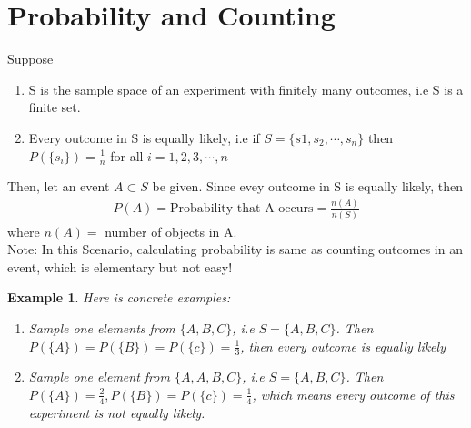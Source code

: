 \documentclass[11pt,oneside]{book}
\theoremstyle{newStyle}
\newtheorem{ex}{Example}[section]
\newcommand{\note}{\color{red}Note: \color{black}}
\begin{document}
\section[Probability and Counting]{Probability and Counting}
Suppose \begin{enumerate}[itemsep=0pt, topsep=1pt, partopsep=0pt,label=(\alph*)]
\item S is the sample space of an experiment with finitely many outcomes, i.e S is a finite set.
\item Every outcome in S is equally likely, i.e if $S=\{s1,s_2,\cdots,s_n\}$ then $P(\{s_i\})=\frac{1}{n}$ for all $i=1,2,3,\cdots,n$
\end{enumerate}
Then, let an event $A\subset S$ be given. Since evey outcome in S is equally likely, then \begin{align*}
P(A)=\text{Probability that A occurs}=\frac{n(A)}{n(S)}
\end{align*}
where $n(A)=$ number of objects in A.\\
\note In this Scenario, calculating probability is same as counting outcomes in an event, which is elementary but not easy! 
\begin{ex}
Here is concrete examples:
\begin{enumerate}
[itemsep=0pt, topsep=1pt, partopsep=0pt,label=(\alph*)]
\item Sample one elements from $\{A,B,C\}$, i.e $S=\{A,B,C\}$. Then $P(\{A\})=P(\{B\})=P(\{c\})=\frac{1}{3}$, then every outcome is equally likely
\item Sample one element from $\{A,A,B,C\}$, i.e $S=\{A,B,C\}$. Then $P(\{A\})=\frac{2}{4},P(\{B\})=P(\{c\})=\frac{1}{4}$, which means every outcome of this experiment is not equally likely.
\end{enumerate}
\end{ex}
\end{document}
